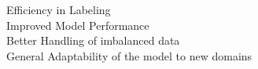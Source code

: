 \documentclass[preview]{standalone}
\begin{document}
Efficiency in Labeling\\Improved Model Performance\\Better Handling of imbalanced data\\General Adaptability of the 
model to new domains\\
\end{document}
